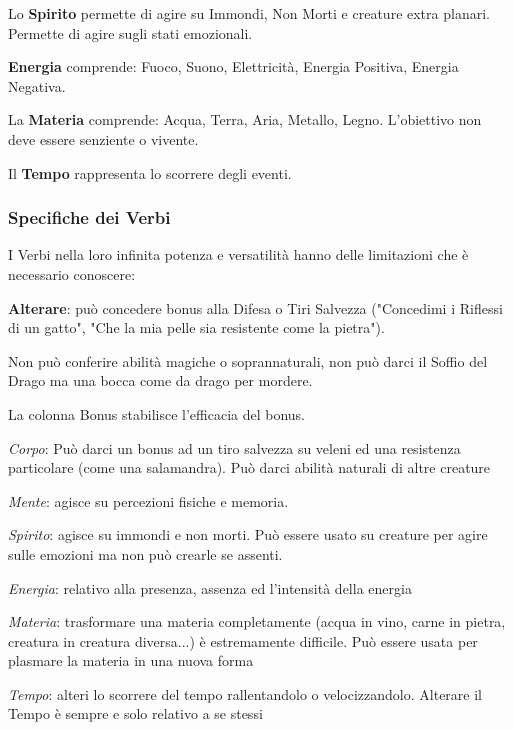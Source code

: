 \documentclass[a4paper,twoside,openany]{book}
\begin{document}
\begin{multicols}{2}
Lo \textbf{Spirito} permette di agire su Immondi, Non Morti e creature extra planari. Permette di agire sugli stati emozionali.

\textbf{Energia} comprende: Fuoco, Suono, Elettricità, Energia Positiva, Energia Negativa.

La \textbf{Materia} comprende: Acqua, Terra, Aria, Metallo, Legno. L'obiettivo non deve essere senziente o vivente.

Il \textbf{Tempo} rappresenta lo scorrere degli eventi.


\subsubsection{Specifiche dei Verbi} %

I Verbi nella loro infinita potenza e versatilità hanno delle limitazioni che è necessario conoscere:

\textbf{Alterare}: può concedere bonus alla Difesa o Tiri Salvezza ("Concedimi i Riflessi di un gatto", "Che la mia pelle sia resistente come la pietra").

Non può conferire abilità magiche o soprannaturali, non può darci il Soffio del Drago ma una bocca come da drago per mordere. 

La colonna Bonus stabilisce l'efficacia del bonus. 

\textit{Corpo}:  Può darci un bonus ad un tiro salvezza su veleni ed una resistenza particolare (come una salamandra). Può darci abilità naturali di altre creature

\textit{Mente}: agisce su percezioni fisiche e memoria. %

\textit{Spirito}: agisce su immondi e non morti. Può essere usato su creature per agire sulle emozioni ma non può crearle se assenti.

\textit{Energia}: relativo alla presenza, assenza ed l'intensità della energia 

\textit{Materia}: trasformare una materia completamente (acqua in vino, carne in pietra, creatura in creatura diversa...) è estremamente difficile. Può essere usata per plasmare la materia in una nuova forma

\textit{Tempo}: alteri lo scorrere del tempo rallentandolo o velocizzandolo. Alterare il Tempo è sempre e solo relativo a se stessi



\end{multicols}
\end{document}
